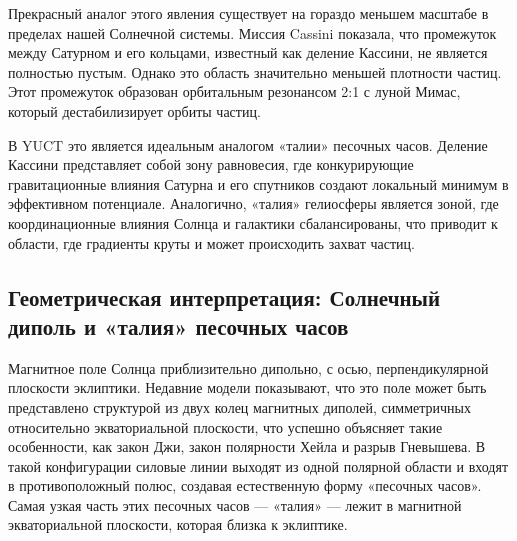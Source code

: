 \documentclass[12pt,a4paper]{article}
\theoremstyle{remark}
\begin{document}
	Прекрасный аналог этого явления существует на гораздо меньшем масштабе в пределах нашей Солнечной системы. Миссия Cassini показала, что промежуток между Сатурном и его кольцами, известный как деление Кассини, не является полностью пустым. Однако это область значительно меньшей плотности частиц. Этот промежуток образован орбитальным резонансом 2:1 с луной Мимас, который дестабилизирует орбиты частиц.
	
	В YUCT это является идеальным аналогом «талии» песочных часов. Деление Кассини представляет собой зону равновесия, где конкурирующие гравитационные влияния Сатурна и его спутников создают локальный минимум в эффективном потенциале. Аналогично, «талия» гелиосферы является зоной, где координационные влияния Солнца и галактики сбалансированы, что приводит к области, где градиенты круты и может происходить захват частиц.
	
	\subsection{Геометрическая интерпретация: Солнечный диполь и «талия» песочных часов}
	\label{subsec:coord:dipole_geometry}
	
	Магнитное поле Солнца приблизительно дипольно, с осью, перпендикулярной плоскости эклиптики. Недавние модели показывают, что это поле может быть представлено структурой из двух колец магнитных диполей, симметричных относительно экваториальной плоскости, что успешно объясняет такие особенности, как закон Джи, закон полярности Хейла и разрыв Гневышева. В такой конфигурации силовые линии выходят из одной полярной области и входят в противоположный полюс, создавая естественную форму «песочных часов». Самая узкая часть этих песочных часов — «талия» — лежит в магнитной экваториальной плоскости, которая близка к эклиптике.
	
\end{document}
